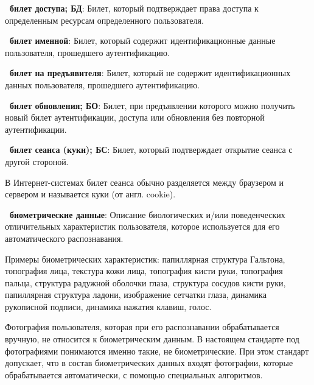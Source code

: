 {\bf \thedefctr~билет доступа; БД}:
Билет, который подтверждает права доступа к определенным ресурсам определенного 
пользователя.

{\bf \thedefctr~билет именной}:
Билет, который содержит идентификационные данные пользователя, прошедшего 
аутентификацию.

{\bf \thedefctr~билет на предъявителя}:
Билет, который не содержит идентификационных данных пользователя, прошедшего 
аутентификацию.

{\bf \thedefctr~билет обновления; БО}:
Билет, при предъявлении которого можно получить новый билет 
аутентификации, доступа или обновления без повторной аутентификации.

{\bf \thedefctr~билет сеанса (куки); БС}:
Билет, который подтверждает открытие сеанса с другой стороной. 

\begin{note*}
В Интернет-системах билет сеанса обычно разделяется между браузером и 
сервером и называется куки (от англ. cookie).
\end{note*}

{\bf \thedefctr~биометрические данные}:
Описание биологических и/или поведенческих отличительных характеристик 
пользователя, которое используется для его автоматического распознавания.

\begin{note}
Примеры биометрических характеристик: папиллярная структура Гальтона, 
топография лица, текстура кожи лица, топография кисти руки, 
топография пальца, структура радужной оболочки глаза, 
структура сосудов кисти руки, 
папиллярная структура ладони, изображение сетчатки глаза, 
динамика рукописной подписи, динамика нажатия клавиш, голос.
\end{note}

\begin{note}
Фотография пользователя, которая при его распознавании обрабатывается вручную,
не относится к биометрическим данным. В настоящем стандарте под фотографиями 
понимаются именно такие, не биометрические. При этом стандарт допускает, что в 
состав биометрических данных входят фотографии, которые обрабатывается 
автоматически, с помощью специальных алгоритмов.
\end{note}

%
% 
%
% 

